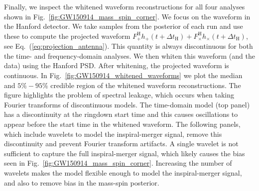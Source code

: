 Finally, we inspect the whitened waveform reconstructions for all four analyses shown in Fig.~\ref{fig:GW150914_mass_spin_corner}.
We focus on the waveform in the Hanford detector.
We take samples from the posterior of each run and use these to compute the projected waveform $F^\mathrm{H}_{+} h_+(t+\Delta t_\mathrm{H})+F^\mathrm{H}_{\times} h_\times(t+\Delta t_\mathrm{H})$, see Eq.~(\ref{eq:projection_antenna}). This quantity is always discontinuous for both the time- and frequency-domain analyses.
We then whiten this waveform (and the data) using the Hanford PSD. After whitening, the projected waveform is continuous.
In Fig.~\ref{fig:GW150914_whitened_waveforms} we plot the median and $5\%-95\%$ credible region of the whitened waveform reconstructions.
The figure highlights the problem of spectral leakage, which occurs when taking Fourier transforms of discontinuous models. 
The time-domain model (top panel) has a discontinuity at the ringdown start time and this causes oscillations to appear before the start time in the whitened waveform.
The following panels, which include wavelets to model the inspiral-merger signal, remove this discontinuity and prevent Fourier transform artifacts.
A single wavelet is not sufficient to capture the full inspiral-merger signal, which likely causes the bias seen in Fig.~\ref{fig:GW150914_mass_spin_corner}. 
Increasing the number of wavelets makes the model flexible enough to model the inspiral-merger signal, and also to remove bias in the mass-spin posterior.